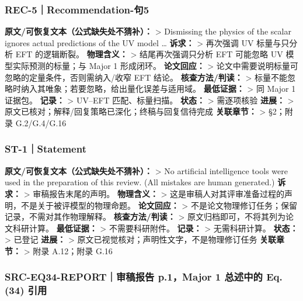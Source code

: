 \documentclass[
  chinese,
  UTF8]{ctexart}
\begin{document}
\subsubsection{REC-5｜Recommendation-句5}\label{rec-5recommendation-ux53e55}

\textbf{原文/可恢复文本（公式缺失处不猜补）：} \textgreater{} Dismissing
the physics of the scalar ignores actual predictions of the UV model
\ldots{} \textbf{诉求：} \textgreater{} 再次强调 UV 标量与只分析 EFT
的逻辑断裂。 \textbf{物理含义：} \textgreater{} 结尾再次强调只分析 EFT
可能忽略 UV 模型实际预测的标量；与 Major 1 形成闭环。
\textbf{论文回应：} \textgreater{}
论文中需要说明标量可忽略的定量条件，否则需纳入/收窄 EFT 结论。
\textbf{核查方法/判读：} \textgreater{}
标量不能忽略时纳入其唯象；若要忽略，给出量化误差与适用域。
\textbf{最低证据：} \textgreater{} 同 Major 1 证据包。 \textbf{记录：}
\textgreater{} UV--EFT 匹配、标量扫描。 \textbf{状态：} \textgreater{}
需逐项核验 \textbf{进展：} \textgreater{}
原文已核对；解释/回复策略已深化；终稿与回复信待完成 \textbf{关联章节：}
\textgreater{} §2；附录 G.2/G.4/G.16

\subsubsection{ST-1｜Statement}\label{st-1statement}

\textbf{原文/可恢复文本（公式缺失处不猜补）：} \textgreater{} No
artificial intelligence tools were used in the preparation of this
review. (All mistakes are human generated.) \textbf{诉求：}
\textgreater{} 审稿报告末尾的声明。 \textbf{物理含义：} \textgreater{}
这是审稿人对其评审准备过程的声明，不是关于被评模型的物理命题。
\textbf{论文回应：} \textgreater{}
不是论文物理修订任务；保留记录，不需对其作物理解释。
\textbf{核查方法/判读：} \textgreater{}
原文归档即可，不将其列为论文科研计算。 \textbf{最低证据：}
\textgreater{} 不需要科研附件。 \textbf{记录：} \textgreater{}
无需科研计算。 \textbf{状态：} \textgreater{} 已登记 \textbf{进展：}
\textgreater{} 原文已视觉核对；声明性文字，不是物理修订任务
\textbf{关联章节：} \textgreater{} 附录 A.12；附录 G.16

\subsubsection{SRC-EQ34-REPORT｜审稿报告 p.1，Major 1 总述中的 Eq. (34)
引用}\label{src-eq34-reportux5ba1ux7a3fux62a5ux544a-p.1major-1-ux603bux8ff0ux4e2dux7684-eq.-34-ux5f15ux7528}
\end{document}

